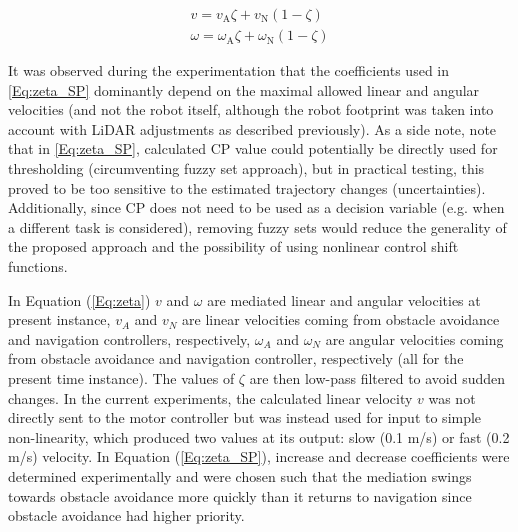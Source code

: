 \begin{equation}
    \label{Eq:zeta}
    \begin{split}
     v = v_\textrm{A}\zeta + v_\textrm{N}(1-\zeta)\\
    \omega = \omega_\textrm{A}\zeta + \omega_\textrm{N}(1-\zeta)
    \end{split}
\end{equation}

It was observed during the experimentation that the coefficients used in \cref{Eq:zeta_SP} dominantly depend on the maximal allowed linear and angular velocities (and not the robot itself, although the robot footprint was taken into account with LiDAR adjustments as described previously). As a side note, note that in \cref{Eq:zeta_SP}, calculated CP value could potentially be directly used for thresholding (circumventing fuzzy set approach), but in practical testing, this proved to be too sensitive to the estimated trajectory changes (uncertainties). Additionally, since CP does not need to be used as a decision variable (e.g. when a different task is considered), removing fuzzy sets would reduce the generality of the proposed approach and the possibility of using nonlinear control shift functions. 

In Equation (\ref{Eq:zeta}) $v$ and $\omega$ are mediated linear and angular velocities at present instance, $v_A$ and $v_N$ are linear velocities coming from obstacle avoidance and navigation controllers, respectively, $\omega_A$ and $\omega_N$ are angular velocities coming from obstacle avoidance and navigation controller, respectively (all for the present time instance). The values of $\zeta$ are then low-pass filtered to avoid sudden changes. In the current experiments, the calculated linear velocity $v$ was not directly sent to the motor controller but was instead used for input to simple non-linearity, which produced two values at its output: slow (0.1 m/s) or fast (0.2 m/s) velocity. In Equation (\ref{Eq:zeta_SP}), increase and decrease coefficients were determined experimentally and were chosen such that the mediation swings towards obstacle avoidance more quickly than it returns to navigation since obstacle avoidance had higher priority. 

